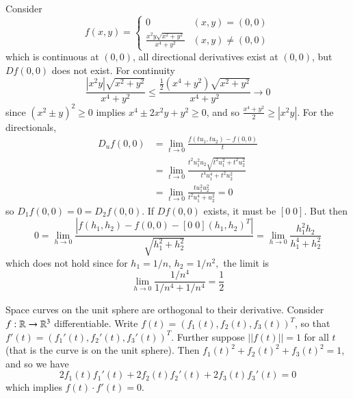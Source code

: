 \begin{eg}
    Consider \begin{equation*}
        f(x,y) = \left\{\begin{array}{cc} 0 & (x,y) = (0,0) \\ \frac{x^2y\sqrt{x^2+y^2}}{x^4+y^2} & (x,y) \neq (0,0)  \end{array}\right.
    \end{equation*}
    which is continuous at $(0,0)$, all directional derivatives exist at $(0,0)$, but $Df(0,0)$ does not exist. For continuity $$\frac{|x^2y|\sqrt{x^2+y^2}}{x^4+y^2} \leq \frac{\frac{1}{2}(x^4+y^2)\sqrt{x^2+y^2}}{x^4+y^2}\rightarrow 0$$ since $(x^2\pm y)^2 \geq 0$ implies $x^4 \pm 2x^2y + y^2 \geq 0$, and so $\frac{x^4+y^2}{2} \geq |x^2y|$. For the directionals, \begin{align*}
        D_uf(0,0) &= \lim\limits_{t\rightarrow 0}\frac{f(tu_1,tu_2) - f(0,0)}{t} \\
        &= \lim\limits_{t\rightarrow 0}\frac{t^2u_1^2u_2\sqrt{t^2u_1^2+t^2u_2^2}}{t^4u_1^4+t^2u_2^2} \\
        &= \lim\limits_{t\rightarrow 0}\frac{tu_1^2u_2^2}{t^2u_1^4+u_2^2} = 0
    \end{align*}
    so $D_1f(0,0) = 0 = D_2f(0,0)$. If $Df(0,0)$ exists, it must be $[0\;0]$. But then $$0 = \lim\limits_{h\rightarrow 0}\frac{|f(h_1,h_2) - f(0,0) - [0\;0](h_1,h_2)^T|}{\sqrt{h_1^2+h_2^2}} = \lim\limits_{h\rightarrow 0}\frac{h_1^2h_2}{h_1^4+h_2^2}$$ which does not hold since for $h_1 = 1/n$, $h_2 = 1/n^2,$ the limit is $$\lim\limits_{h\rightarrow 0}\frac{1/n^4}{1/n^4+1/n^4} = \frac{1}{2}$$
\end{eg}

\begin{eg}
    Space curves on the unit sphere are orthogonal to their derivative. Consider $f:\mathbb R\rightarrow \mathbb R^3$ differentiable. Write $f(t) = (f_1(t),f_2(t),f_3(t))^T$, so that $f'(t) = (f_1'(t),f_2'(t),f_3'(t))^T$. Further suppose $||f(t)|| = 1$ for all $t$ (that is the curve is on the unit sphere). Then $f_1(t)^2+f_2(t)^2+f_3(t)^2 = 1$, and so we have $$2f_1(t)f_1'(t) +2f_2(t)f_2'(t)+2f_3(t)f_3'(t) = 0$$ which implies $f(t)\cdot f'(t) = 0$.
\end{eg}


